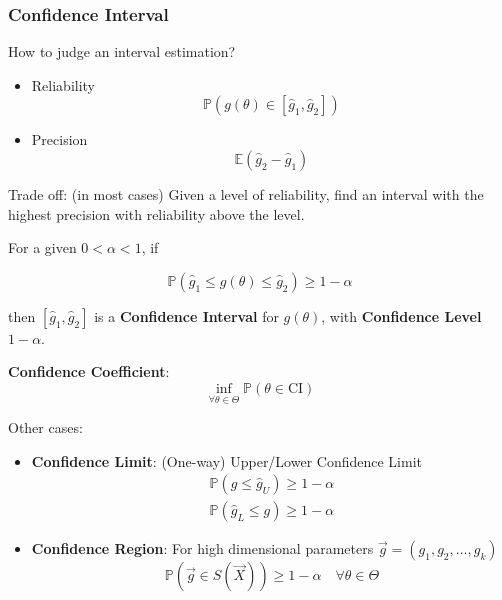     \subsubsection{Confidence Interval}\label{SubSectionConfidenceInterval}
    How to judge an interval estimation?
    \begin{itemize}
        \item Reliability
        \begin{equation}\mathbb{P}(g(\theta)\in[\hat{g}_1,\hat{g}_2])\end{equation}
        \item Precision
        \begin{equation}\mathbb{E}(\hat{g}_2-\hat{g}_1)\end{equation}
    \end{itemize}

    Trade off: (in most cases) Given a level of reliability, find an interval with the highest precision with reliability above the level.


\begin{point}
    For a given $0<\alpha<1$, if 
\end{point}

    \begin{equation}
        \mathbb{P}(\hat{g}_1\leq g(\theta)\leq \hat{g}_2)\geq 1-\alpha
    \end{equation}

    then $[\hat{g}_1,\hat{g}_2]$ is a \textbf{Confidence Interval} for $g(\theta)$, with \textbf{Confidence Level} $1-\alpha$. 
    
    \textbf{Confidence Coefficient}:
    \begin{equation}\inf_{\forall\theta\in\Theta}\mathbb{P}(
        \theta\in\mathrm{CI}
    )\end{equation}

    Other cases:
    \begin{itemize}[topsep=-4pt]
        \item \textbf{Confidence Limit}: (One-way) Upper/Lower Confidence Limit
    \begin{align*}
        \mathbb{P}(g\leq \hat{g}_U)\geq 1-\alpha\\
        \mathbb{P}(\hat{g}_L\leq g)\geq 1-\alpha
    \end{align*}
        \item \textbf{Confidence Region}: For high dimensional parameters $\vec{g}=(g_1,g_2,\ldots,g_k)$
        \begin{equation}\mathbb{P}(\vec{g}\in S(\vec{X}))\geq 1-\alpha\quad \forall \theta\in\Theta \end{equation}
        
    \end{itemize}

